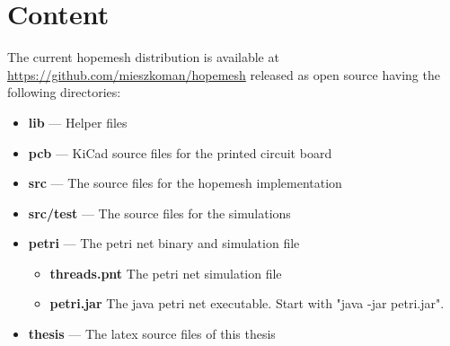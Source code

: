 \chapter{Content}
\label{cha:appendix_a}

The current hopemesh distribution is available at \url{https://github.com/mieszkoman/hopemesh} released as open source having the following directories:

\begin{itemize}
    \item \textbf{lib} --- Helper files
    \item \textbf{pcb} --- KiCad source files for the printed circuit board
    \item \textbf{src} --- The source files for the hopemesh implementation
    \item \textbf{src/test} --- The source files for the simulations
    \item \textbf{petri} --- The petri net binary and simulation file
        \begin{itemize}
            \item \textbf{threads.pnt} The petri net simulation file
            \item \textbf{petri.jar} The java petri net executable. Start with "java -jar petri.jar".
        \end{itemize}
    \item \textbf{thesis} --- The latex source files of this thesis
\end{itemize}
